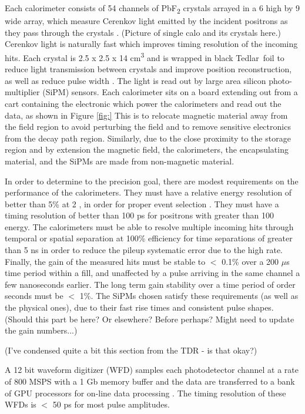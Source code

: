 Each calorimeter consists of 54 channels of PbF\textsubscript{2} crystals arrayed in a 6 high by 9 wide array, which measure Cerenkov light emitted by the incident positrons as they pass through the crystals \cite{Fienberg:2014kka}. (Picture of single calo and its crystals here.) Cerenkov light is naturally fast which improves timing resolution of the incoming hits. Each crystal is 2.5 x 2.5 x 14 cm\textsuperscript{3} and is wrapped in black Tedlar\textregistered\ foil to reduce light transmission between crystals and improve position reconstruction, as well as reduce pulse width \cite{Kaspar:2016ofv}. The light is read out by large area silicon photo-multiplier (SiPM) sensors. Each calorimeter sits on a board extending out from a cart containing the electronic which power the calorimeters and read out the data, as shown in Figure \ref{fig:} This is to relocate magnetic material away from the field region to avoid perturbing the field and to remove sensitive electronics from the decay path region. Similarly, due to the close proximity to the storage region and by extension the magnetic field, the calorimeters, the encapsulating material, and the SiPMs are made from non-magnetic material.

In order to determine \amu to the precision goal, there are modest requirements on the performance of the calorimeters. They must have a relative energy resolution of better than 5\% at 2 \GeV, in order for proper event selection \cite{TDR}. They must have a timing resolution of better than 100 ps for positrons with greater than 100 \MeV energy. The calorimeters must be able to resolve multiple incoming hits through temporal or spatial separation at 100\% efficiency for time separations of greater than 5 ns in order to reduce the pileup systematic error due to the high rate. Finally, the gain of the measured hits must be stable to $<$ 0.1\% over a 200 $\mu$s time period within a fill, and unaffected by a pulse arriving in the same channel a few nanoseconds earlier. The long term gain stability over a time period of order seconds must be $<$ 1\%. The SiPMs chosen satisfy these requirements (as well as the physical ones), due to their fast rise times and consistent pulse shapes. (Should this part be here? Or elsewhere? Before perhaps? Might need to update the gain numbers...)

(I've condensed quite a bit this section from the TDR - is that okay?)

A 12 bit waveform digitizer (WFD) samples each photodetector channel at a rate of 800 MSPS with a 1 Gb memory buffer and the data are transferred to a bank of GPU processors for on-line data processing \cite{Sweigart:2016jty}. The timing resolution of these WFDs is $<$ 50 ps for most pulse amplitudes.

